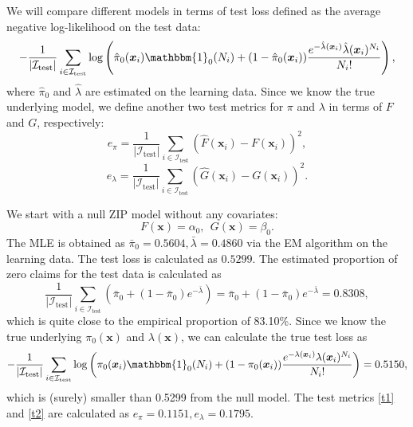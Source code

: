 \documentclass[11pt]{article}
\numberwithin{equation}{section}
\def\bx{\boldsymbol{x}}
\begin{document}
We will compare different models in terms of test loss defined as the average negative log-likelihood on the test data:
\begin{equation}\label{zip-test-loss}
	-\frac{1}{|\mathcal{I}_\text{test}|}\sum_{i\in\mathcal{I}_\text{test}}\log \left(\hat{\pi}_0(\bx_i)\mathbbm{1}_0(N_i) + 
	(1-\hat{\pi}_0(\bx_i))\frac{e^{-\hat{\lambda}(\bx_i)}\hat{\lambda}(\bx_i)^{N_i}}{N_i!}\right),
\end{equation} 
where $\hat{\pi}_0$ and $\hat{\lambda}$ are estimated on the learning data. 
Since we know the true underlying model, we define another two test metrics for $\pi$ and $\lambda$ in terms of $F$ and $G$, respectively:
\begin{equation}\label{t1}
	e_\pi=\frac{1}{|\mathcal{I}_\text{test}|}\sum_{i\in\mathcal{I}_\text{test}}(\hat{F}(\bx_i)-F(\bx_i))^2,
\end{equation}
\begin{equation}\label{t2}
	e_\lambda=\frac{1}{|\mathcal{I}_\text{test}|}\sum_{i\in\mathcal{I}_\text{test}}(\hat{G}(\bx_i)-G(\bx_i))^2.
\end{equation}


We start with a null ZIP model without any covariates:
\begin{equation}\label{zip-null}
	F(\bx)=\alpha_0, ~~G(\bx)=\beta_0. 
\end{equation}
The MLE is obtained as $\bar{\pi}_0=0.5604, \bar{\lambda}=0.4860$ via the EM algorithm on the learning data.
The test loss is calculated as $0.5299$. 
The estimated proportion of zero claims for the test data is calculated as 
$$\frac{1}{|\mathcal{I}_\text{test}|}\sum_{i\in\mathcal{I}_\text{test}}\left(\bar{\pi}_0+(1-\bar{\pi}_0)e^{-\bar{\lambda}}\right)=\bar{\pi}_0+(1-\bar{\pi}_0)e^{-\bar{\lambda}}=0.8308,$$
which is quite close to the empirical proportion of 83.10\%.
Since we know the true underlying $\pi_0(\bx)$ and $\lambda(\bx)$, we can calculate the true test loss as 
\begin{equation}
	-\frac{1}{|\mathcal{I}_\text{test}|}\sum_{i\in\mathcal{I}_\text{test}}\log \left({\pi}_0(\bx_i)\mathbbm{1}_0(N_i) + 
	(1-{\pi}_0(\bx_i))\frac{e^{-{\lambda}(\bx_i)}{\lambda}(\bx_i)^{N_i}}{N_i!}\right)=0.5150,
\end{equation}   
which is (surely) smaller than 0.5299 from the null model.
The test metrics \eqref{t1} and \eqref{t2} are calculated as $e_\pi=0.1151, e_\lambda=0.1795$.
\end{document}
